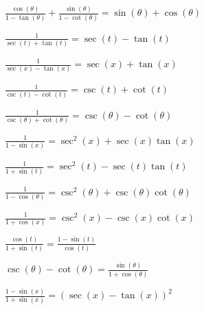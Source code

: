 \documentclass{ximera}
\begin{document}
\begin{question}
\begin{problem}
    $\frac{\cos(\theta)}{1 - \tan(\theta)} + \frac{\sin(\theta)}{1 - \cot(\theta)} = \sin(\theta) + \cos(\theta)$
\end{problem}

\begin{problem}
    $\frac{1}{\sec(t) + \tan(t)} = \sec(t) - \tan(t)$
\end{problem}

\begin{problem}
    $\frac{1}{\sec(x) - \tan(x)} = \sec(x) + \tan(x)$
\end{problem}

\begin{problem}
    $\frac{1}{\csc(t) - \cot(t)} = \csc(t) + \cot(t)$
\end{problem}

\begin{problem}
    $\frac{1}{\csc(\theta) + \cot(\theta)} = \csc(\theta) - \cot(\theta)$
\end{problem}

\begin{problem}
    $\frac{1}{1-\sin(x)} = \sec^{2}(x) + \sec(x) \tan(x)$
\end{problem}

\begin{problem}
    $\frac{1}{1+\sin(t)} = \sec^{2}(t) - \sec(t) \tan(t)$
\end{problem}

\begin{problem}
    $\frac{1}{1-\cos(\theta)} = \csc^{2}(\theta) + \csc(\theta) \cot(\theta)$
\end{problem}

\begin{problem}
    $\frac{1}{1+\cos(x)} = \csc^{2}(x) - \csc(x) \cot(x)$
\end{problem}

\begin{problem}
    $\frac{\cos(t)}{1 + \sin(t)} = \frac{1-\sin(t)}{\cos(t)}$
\end{problem}

\begin{problem}
    $\csc(\theta) - \cot(\theta) = \frac{\sin(\theta)}{1 + \cos(\theta)}$
\end{problem}

\begin{problem}\label{lastcirciden}
    $\frac{1 - \sin(x)}{1 + \sin(x)} = (\sec(x) - \tan(x))^{2}$
\end{problem}
\end{question}
\end{document}

